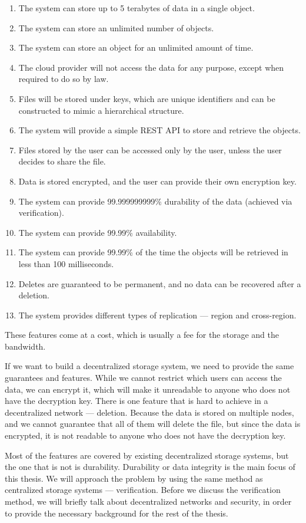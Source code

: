 \begin{enumerate}
    \label{s3-requirements}
    \item The system can store up to 5 terabytes of data in a single object.
    \item The system can store an unlimited number of objects.
    \item The system can store an object for an unlimited amount of time.
    \item The cloud provider will not access the data for any purpose, except when required to do so by law.
    \item Files will be stored under keys, which are unique identifiers and
        can be constructed to mimic a hierarchical structure.
    \item The system will provide a simple REST API to store and retrieve the objects.
    \item Files stored by the user can be accessed only by the user, unless the user decides to share the file.
    \item Data is stored encrypted, and the user can provide their own encryption key.
    \item The system can provide 99.999999999\% durability of the data (achieved via verification).
    \item The system can provide 99.99\% availability.
    \item The system can provide 99.99\% of the time the objects will be retrieved in less than 100 milliseconds.
    \item Deletes are guaranteed to be permanent, and no data can be recovered after a deletion.
    \item The system provides different types of replication --- region and cross-region.
\end{enumerate}

These features come at a cost, which is usually a fee for the storage and the bandwidth.

If we want to build a decentralized storage system, we need to provide the same guarantees and features.
While we cannot restrict which users can access the data, we can encrypt it,
which will make it unreadable to anyone who does not have the decryption key.
There is one feature that is hard to achieve in a decentralized network --- deletion.
Because the data is stored on multiple nodes, and we cannot guarantee that all of them will delete the file,
but since the data is encrypted, it is not readable to anyone who does not have the decryption key.

Most of the features are covered by existing decentralized storage systems, but the one that is not is durability.
Durability or data integrity is the main focus of this thesis.
We will approach the problem by using the same method as centralized storage systems --- verification.
Before we discuss the verification method, we will briefly talk about decentralized networks and security,
in order to provide the necessary background for the rest of the thesis.
